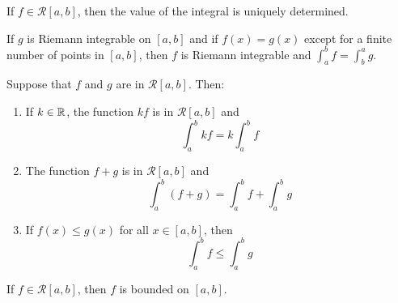 \begin{theorem}
	If $f \in \mathcal{R}[a,b]$, then the value of the integral is uniquely determined.
\end{theorem}

\begin{theorem}
	If $g$ is Riemann integrable on $[a,b]$ and if $f(x)=g(x)$ except for a finite number of points in $[a,b]$, then $f$ is Riemann integrable and $\displaystyle\int_{a}^{b}f=\displaystyle\int_{b}^{a}g$.
\end{theorem}

\begin{theorem}
	Suppose that $f$ and $g$ are in $\mathcal{R}[a,b]$. Then:
	\begin{enumerate}
		\item If $k \in \mathbb{R}$, the function $kf$ is in $\mathcal{R}[a,b]$ and
		      \[\displaystyle\int_{a}^{b}kf=k\displaystyle\int_{a}^{b}f\]

		\item The function $f+g$ is in $\mathcal{R}[a,b]$ and
		      \[\displaystyle\int_{a}^{b}(f+g)=\displaystyle\int_{a}^{b}f+\displaystyle\int_{a}^{b}g\]

		\item If $f(x) \leq g(x)$ for all $x \in [a,b]$, then
		      \[\displaystyle\int_{a}^{b}f \leq \displaystyle\int_{a}^{b}g\]
	\end{enumerate}
\end{theorem}

\begin{theorem}
	If $f \in \mathcal{R}[a,b]$, then $f$ is bounded on $[a,b]$.
\end{theorem}
